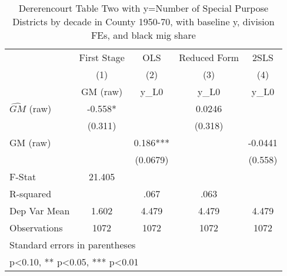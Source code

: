 \begin{table}[htbp]\centering
\def\sym#1{\ifmmode^{#1}\else\(^{#1}\)\fi}
\caption{Dererencourt Table Two with y=Number of Special Purpose Districts by decade in County 1950-70, with baseline y, division FEs, and black mig share}
\begin{tabular}{l*{4}{c}}
\toprule
                    & First Stage   &         OLS   &Reduced Form   &        2SLS   \\
                    &\multicolumn{1}{c}{(1)}&\multicolumn{1}{c}{(2)}&\multicolumn{1}{c}{(3)}&\multicolumn{1}{c}{(4)}\\
                    &\multicolumn{1}{c}{GM  (raw)}&\multicolumn{1}{c}{y\_L0}&\multicolumn{1}{c}{y\_L0}&\multicolumn{1}{c}{y\_L0}\\
\midrule
$\hat{GM}$ (raw)    &      -0.558*  &               &      0.0246   &               \\
                    &     (0.311)   &               &     (0.318)   &               \\
\addlinespace
GM  (raw)           &               &       0.186***&               &     -0.0441   \\
                    &               &    (0.0679)   &               &     (0.558)   \\
\midrule
F-Stat              &      21.405   &               &               &               \\
R-squared           &               &        .067   &        .063   &               \\
Dep Var Mean        &       1.602   &       4.479   &       4.479   &       4.479   \\
Observations        &        1072   &        1072   &        1072   &        1072   \\
\bottomrule
\multicolumn{5}{l}{\footnotesize Standard errors in parentheses}\\
\multicolumn{5}{l}{\footnotesize * p<0.10, ** p<0.05, *** p<0.01}\\
\end{tabular}
\end{table}
